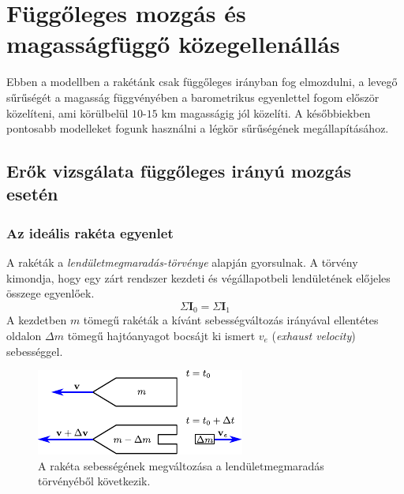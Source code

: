\documentclass[12pt]{article}
\renewcommand{\vec}[1]{\mathbf{#1}} %
\begin{document}
\section{Függőleges mozgás és magasságfüggő közegellenállás}
Ebben a modellben a rakétánk csak függőleges irányban fog elmozdulni, a levegő sűrűségét a magasság függvényében a barometrikus egyenlettel fogom először közelíteni, ami körülbelül $10$-$15$ km magasságig jól közelíti.
A későbbiekben pontosabb modelleket fogunk használni a légkör sűrűségének megállapításához.

\subsection{Erők vizsgálata függőleges irányú mozgás esetén}
\subsubsection{Az ideális rakéta egyenlet}
A rakéták a \textit{lendületmegmaradás-törvénye} alapján gyorsulnak. A törvény kimondja, hogy egy zárt rendszer kezdeti és végállapotbeli lendületének előjeles összege egyenlőek.
\begin{equation}
    \Sigma \vec{I}_0 = \Sigma \vec{I}_1
    \label{eq:lenduletmegmaradas}
\end{equation}
A kezdetben $m$ tömegű rakéták a kívánt sebességváltozás irányával ellentétes oldalon $\Delta m$ tömegű hajtóanyagot bocsájt ki ismert $v_e$ (\textit{exhaust velocity}) sebességgel. 
\begin{figure}[h!]
    \centering
    \includegraphics[width=0.6\linewidth]{figures/ciolkovszky.pdf}
    \caption{\centering A rakéta sebességének megváltozása a lendületmegmaradás törvényéből következik.}
    \label{fig:ciolkovszky}
\end{figure}
\end{document}
